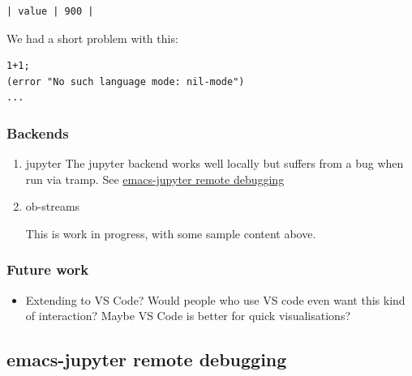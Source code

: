 \documentclass[11pt]{article}
\begin{document}
\begin{verbatim}
| value | 900 |
\end{verbatim}

We had a short problem with this:

\begin{verbatim}
1+1;
(error "No such language mode: nil-mode")
...
\end{verbatim}

\subsubsection{Backends}
\label{sec:orgc6c2ec3}
\begin{enumerate}
\item jupyter
\label{sec:org6d237ea}
The jupyter backend works well locally but suffers from a bug when run via tramp. See \hyperref[sec:org7301cd1]{emacs-jupyter remote debugging}

\item ob-streams
\label{sec:orgf62b037}

This is work in progress, with some sample content above.
\end{enumerate}

\subsubsection{Future work}
\label{sec:orgd7d000b}

\begin{itemize}
\item Extending to VS Code?  Would people who use VS code even want this kind of interaction?  Maybe VS Code is better for quick visualisations?
\end{itemize}
\subsection{emacs-jupyter remote debugging}
\label{sec:org7301cd1}
\end{document}
